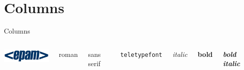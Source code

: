 \section{Columns}

\begin{frame}{Columns}
	\begin{columns}
		\center\includegraphics[width=3cm]{pic/epam}
		
		{\rmfamily roman}
		
		{\sffamily sans serif}
		
		{\tt teletypefont}
		
		{\it italic}
		
		{\bf bold}
		
		\textit{\textbf{bold italic}}
	\end{columns}
\end{frame}


